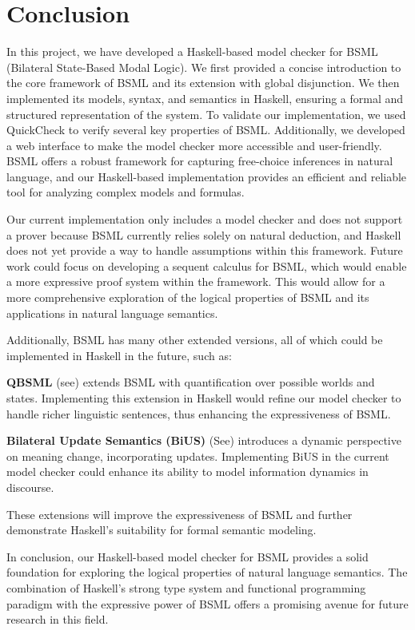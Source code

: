 \section{Conclusion}\label{sec:Conclusion}

In this project, we have developed a Haskell-based model checker for BSML (Bilateral State-Based Modal Logic). 
We first provided a concise introduction to the core framework of BSML and its extension with global disjunction.
We then implemented its models, syntax, and semantics in Haskell, ensuring a formal and structured representation of the system.\@ 
To validate our implementation, we used QuickCheck to verify several key properties of BSML.\@
Additionally, we developed a web interface to make the model checker more accessible and user-friendly.
BSML offers a robust framework for capturing free-choice inferences in natural language,
and our Haskell-based implementation provides an efficient and reliable tool for analyzing complex models and formulas.


Our current implementation only includes a model checker and does not support a prover because BSML currently relies solely on natural deduction, and Haskell does not yet provide a way to handle assumptions within this framework.
Future work could focus on developing a sequent calculus for BSML, which would enable a more expressive proof system within the framework.
This would allow for a more comprehensive exploration of the logical properties of BSML and its applications in natural language semantics.

Additionally, BSML has many other extended versions, all of which could be implemented in Haskell in the future, such as:

\textbf{QBSML} (see\cite{Aloni2023}) extends BSML with quantification over possible worlds and states. Implementing this extension in Haskell would refine our model checker to handle richer linguistic sentences, thus enhancing the expressiveness of BSML.\@

\textbf{Bilateral Update Semantics (BiUS)} (See\cite{BiUS2023}) introduces a dynamic perspective on meaning change, incorporating updates. Implementing BiUS in the current model checker could enhance its ability to model information dynamics in discourse.

These extensions will improve the expressiveness of BSML and further demonstrate Haskell's suitability for formal semantic modeling.

In conclusion, our Haskell-based model checker for BSML provides a solid foundation for exploring the logical properties of natural language semantics.
The combination of Haskell's strong type system and functional programming paradigm with the expressive power of BSML offers a promising avenue for future research in this field.
